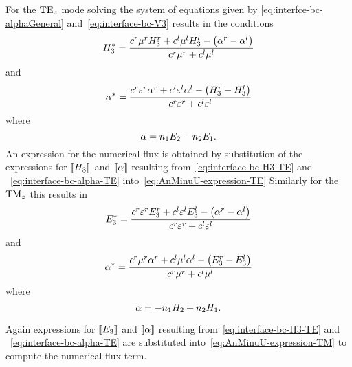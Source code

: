 For the $\textrm{TE}_{z}$ mode solving the system of equations given by \eqref{eq:interfce-bc-alphaGeneral} and~\eqref{eq:interface-bc-V3} results in the conditions
\begin{equation}
H_3^* = \frac{c^r \mu^r H_3^r + c^l \mu^l H_3^l - \left(\alpha^r - \alpha^l \right)}{c^r \mu^r + c^l \mu^l } \label{eq:interface-bc-H3-TE}
\end{equation}
and
\begin{equation}
\alpha^* = \frac{c^r \varepsilon^r \alpha^r + c^l \varepsilon^l \alpha^l - \left( H_3^r - H_3^l \right) }{c^r \varepsilon^r + c^l \varepsilon^l} \label{eq:interface-bc-alpha-TE}
\end{equation}
where
$$ \alpha = n_1 E_2 - n_2 E_1. $$
An expression for the numerical flux is obtained by substitution of the expressions for $\llbracket H_3 \rrbracket$ and $\llbracket \alpha \rrbracket$ resulting from~\eqref{eq:interface-bc-H3-TE} and ~\eqref{eq:interface-bc-alpha-TE} into~\eqref{eq:AnMinuU-expression-TE}
Similarly for the $\textrm{TM}_{z}$ this results in 
\begin{equation}
E_3^* = \frac{c^r \varepsilon^r E_3^r + c^l \varepsilon^l E_3^l - \left(\alpha^r - \alpha^l \right)}{c^r \varepsilon^r + c^l \varepsilon^l }
\end{equation}
and
\begin{equation}
\alpha^* = \frac{c^r \mu^r \alpha^r + c^l \mu^l \alpha^l - \left( E_3^r - E_3^l \right) }{c^r \mu^r + c^l \mu^l}
\end{equation}
where
$$ \alpha = - n_1 H_2 + n_2 H_1. $$

Again expressions for $\llbracket E_3 \rrbracket$ and $\llbracket \alpha \rrbracket$ resulting from~\eqref{eq:interface-bc-H3-TE} and ~\eqref{eq:interface-bc-alpha-TE} are substituted into~\eqref{eq:AnMinuU-expression-TM} to compute the numerical flux term.
